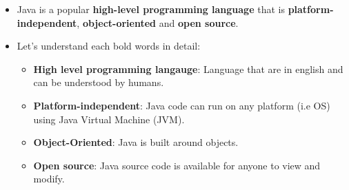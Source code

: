 
\begin{flushleft}

	\begin{itemize}
		\item Java is a popular \textbf{high-level programming language} that is \textbf{platform-independent}, \textbf{object-oriented} and \textbf{open source}.
		\item Let’s understand each bold words in detail:
		\begin{itemize}
			\item \textbf{High level programming langauge}: Language that are in english and can be understood by humans.
			
			
			\item \textbf{Platform-independent}: Java code can run on any platform (i.e OS) using Java Virtual Machine (JVM). 
			
						
			\item \textbf{Object-Oriented}: Java is built around objects.
			
			
			\item \textbf{Open source}: Java source code is available for anyone to view and modify.
			
			
		\end{itemize}
	\end{itemize}
		
\end{flushleft}

\newpage

